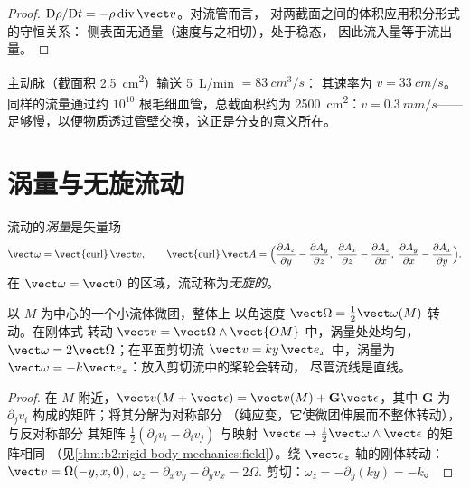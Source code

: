 \begin{proof}
$\mathrm D\rho/\mathrm Dt = -\rho\operatorname{div}\vect v$。对流管而言，
对两截面之间的体积应用积分形式的守恒关系：
侧表面无通量（速度与之相切），处于稳态，
因此流入量等于流出量。
\end{proof}

\begin{example}[血液]\label{ex:b2:fluid-kinematics:blood}
主动脉（截面积 \qty{2.5}{cm^2}）输送 \qty{5}{L/min} $= \qty{83}{cm^3/s}$：
其速率为 $v = \qty{33}{cm/s}$。同样的流量通过约 $10^{10}$
根毛细血管，总截面积约为 \qty{2500}{cm^2}：$v = \qty{0.3}{mm/s}$——
足够慢，以便物质透过管壁交换，这正是分支的意义所在。
\end{example}

\section{涡量与无旋流动}

\begin{definition}[涡量]\label{def:b2:fluid-kinematics:vorticity}
流动的\emph{涡量}是矢量场
\[
\vect\omega = \operatorname{\vect{curl}}\vect v , \qquad
\operatorname{\vect{curl}}\vect A = \Bigl(\frac{\partial A_z}{\partial y} -
\frac{\partial A_y}{\partial z},\; \frac{\partial A_x}{\partial z} - \frac{\partial A_z}
{\partial x},\; \frac{\partial A_y}{\partial x} - \frac{\partial A_x}{\partial y}\Bigr) .
\]
在 $\vect\omega = \vect 0$ 的区域，流动称为\emph{无旋的}。
\end{definition}

\begin{proposition}[涡量度量局部转动]\label{prop:b2:fluid-kinematics:rotation}
以 $M$ 为中心的一个小流体微团，整体上
以角速度 $\vect\Omega = \tfrac12\vect\omega(M)$ 转动。在刚体式
转动 $\vect v = \vect\Omega\wedge\vect{OM}$ 中，涡量处处均匀，
$\vect\omega = 2\vect\Omega$；在平面剪切流 $\vect v = ky\,\vect e_x$
中，涡量为 $\vect\omega = -k\vect e_z$：放入剪切流中的桨轮会转动，
尽管流线是直线。
\end{proposition}

\begin{proof}
在 $M$ 附近，$\vect v(M + \vect\epsilon) = \vect v(M) + \mathbf G\vect\epsilon$，其中
$\mathbf G$ 为 $\partial_jv_i$ 构成的矩阵；将其分解为对称部分
（纯应变，它使微团伸展而不整体转动），与反对称部分
其矩阵 $\tfrac12(\partial_jv_i -
\partial_iv_j)$ 与映射 $\vect\epsilon \mapsto \tfrac12\vect\omega\wedge\vect\epsilon$ 的矩阵相同
（见\cref{thm:b2:rigid-body-mechanics:field}）。绕 $\vect e_z$ 轴的刚体转动：
$\vect v = \Omega(-y, x, 0)$, $\omega_z = \partial_xv_y - \partial_yv_x = 2\Omega$.
剪切：$\omega_z = -\partial_y(ky) = -k$。
\end{proof}

